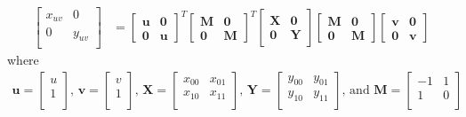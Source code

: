 \documentclass{report}
\begin{document}
\begin{equation*}
\begin{split}
\begin{bmatrix}x_{uv} & 0 \\ 0 & y_{uv}\\\end{bmatrix}
&=
\begin{bmatrix}\mathbf{u} & \mathbf{0} \\ \mathbf{0} & \mathbf{u} \end{bmatrix}^{T}
\begin{bmatrix}\mathbf{M} & \mathbf{0} \\ \mathbf{0} & \mathbf{M} \end{bmatrix}^{T}
\begin{bmatrix}\mathbf{X} & \mathbf{0} \\ \mathbf{0} & \mathbf{Y} \end{bmatrix}
\begin{bmatrix}\mathbf{M} & \mathbf{0} \\ \mathbf{0} & \mathbf{M} \end{bmatrix}
\begin{bmatrix}\mathbf{v} & \mathbf{0} \\ \mathbf{0} & \mathbf{v} \end{bmatrix}
\end{split}
\end{equation*}
where
\begin{equation*}
\begin{split}
%
\mathbf{u} =\begin{bmatrix}u \\ 1\\\end{bmatrix}
\text{, }
%
\mathbf{v} =\begin{bmatrix}v \\ 1\\\end{bmatrix}
\text{, }
%
\mathbf{X} =\begin{bmatrix}x_{00} & x_{01} \\ x_{10} & x_{11}\\\end{bmatrix}
\text{, }
%
\mathbf{Y} =\begin{bmatrix}y_{00} & y_{01} \\ y_{10} & y_{11}\\\end{bmatrix}
\text{, and }
%
\mathbf{M} =\begin{bmatrix}-1 & 1 \\ 1 & 0\\\end{bmatrix}
\end{split}
\end{equation*}
\end{document}
